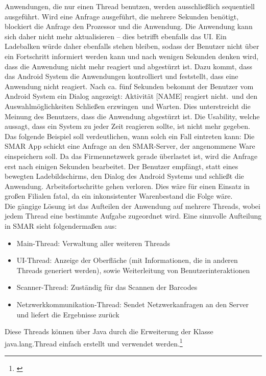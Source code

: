 Anwendungen, die nur einen Thread benutzen, werden ausschließlich sequentiell ausgeführt. Wird eine Anfrage ausgeführt, die mehrere Sekunden benötigt, blockiert die Anfrage den Prozessor und die Anwendung. Die Anwendung kann sich daher nicht mehr aktualisieren -- dies betrifft ebenfalls das \ac{UI}. Ein Ladebalken würde daher ebenfalls stehen bleiben, sodass der Benutzer nicht über ein Fortschritt informiert werden kann und nach wenigen Sekunden denken wird, dass die Anwendung nicht mehr reagiert und abgestürzt ist. Dazu kommt, dass das Android System die Anwendungen kontrolliert und feststellt, dass eine Anwendung nicht reagiert. Nach ca. fünf Sekunden bekommt der Benutzer vom Android System ein Dialog angezeigt: \glqq Aktivität [NAME] reagiert nicht.\grqq\ und den Auswahlmöglichkeiten \glqq Schließen erzwingen\grqq\ und \glqq Warten\grqq . Dies unterstreicht die Meinung des Benutzers, dass die Anwendung abgestürzt ist. Die Usability, welche aussagt, dass ein System zu jeder Zeit reagieren sollte, ist nicht mehr gegeben.\\

Das folgende Beispiel soll verdeutlichen, wann solch ein Fall eintreten kann: Die \ac{SMAR} App schickt eine Anfrage an den \ac{SMAR}-Server, der angenommene Ware einspeichern soll. Da das Firmennetzwerk gerade überlastet ist, wird die Anfrage erst nach einigen Sekunden bearbeitet. Der Benutzer empfängt, statt eines bewegten Ladebildschirms, den Dialog des Android Systems und schließt die Anwendung. Arbeitsfortschritte gehen verloren. Dies wäre für einen Einsatz in großen Filialen fatal, da ein inkonsistenter Warenbestand die Folge wäre.\\

Die gängige Lösung ist das Aufteilen der Anwendung auf mehrere Threads, wobei jedem Thread eine bestimmte Aufgabe zugeordnet wird. Eine sinnvolle Aufteilung in \ac{SMAR} sieht folgendermaßen aus:
\begin{itemize}
	\item Main-Thread: Verwaltung aller weiteren Threads
	\item UI-Thread: Anzeige der Oberfläche (mit Informationen, die in anderen Threads generiert werden), sowie Weiterleitung von Benutzerinteraktionen
	\item Scanner-Thread: Zuständig für das Scannen der Barcodes
	\item Netzwerkkommunikation-Thread: Sendet Netzwerkanfragen an den Server und liefert die Ergebnisse zurück
\end{itemize}
Diese Threads können über Java durch die Erweiterung der Klasse java.lang.Thread einfach erstellt und verwendet werden.\footnote{\citep[S. 18ff.]{java_threads}}\\

